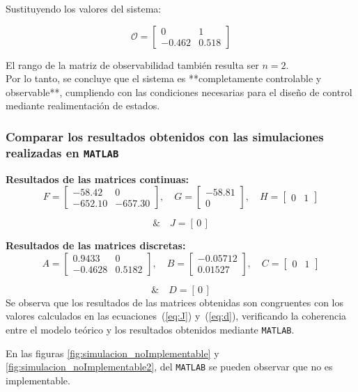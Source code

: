Sustituyendo los valores del sistema:

\[
\mathcal{O} =
\begin{bmatrix}
	0 & 1 \\[4pt]
	-0.462 & 0.518
\end{bmatrix}
\]

El rango de la matriz de observabilidad también resulta ser $n = 2$.\\  
Por lo tanto, se concluye que el sistema es **completamente controlable y observable**, cumpliendo con las condiciones necesarias para el diseño de control mediante realimentación de estados.

\subsubsection{Comparar los resultados obtenidos con las simulaciones realizadas en \texttt{MATLAB}}
\textbf{Resultados de las matrices continuas:}
\[
F =
\begin{bmatrix}
	-58.42 & 0 \\[4pt]
	-652.10 & -657.30
\end{bmatrix}, \quad
G =
\begin{bmatrix}
	-58.81 \\[4pt]
	0
\end{bmatrix}, \quad
H =
\begin{bmatrix}
	0 & 1
\end{bmatrix}
\]

\[
	\& \quad
	J = [\,0\,]
\]

\textbf{Resultados de las matrices discretas:}
\[
A =
\begin{bmatrix}
	0.9433 & 0 \\[4pt]
	-0.4628 & 0.5182
\end{bmatrix}, \quad
B =
\begin{bmatrix}
	-0.05712 \\[4pt]
	0.01527
\end{bmatrix}, \quad
C =
\begin{bmatrix}
	0 & 1
\end{bmatrix}
\]

\[
	\& \quad
	D = [\,0\,]
\]
Se observa que los resultados de las matrices obtenidas son congruentes con los valores calculados en las ecuaciones~(\ref{eq:J}) y~(\ref{eq:d}), verificando la coherencia entre el modelo teórico y los resultados obtenidos mediante \texttt{MATLAB}.



En las figuras \ref{fig:simulacion_noImplementable} y \ref{fig:simulacion_noImplementable2}, del \texttt{MATLAB} se pueden observar que no es implementable.